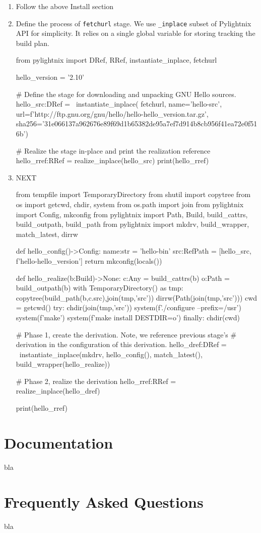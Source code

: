 \documentclass{article}
\begin{document}
\begin{enumerate}

  \item Follow the above Install section

  \item Define the process of \texttt{fetchurl} stage. We use \texttt{\_inplace}
    subset of Pylightnix API for simplicity. It relies on a single global
    variable for storing tracking the build plan.

    \begin{pythoncode}
    from pylightnix import DRef, RRef, instantiate_inplace, fetchurl

    hello_version = '2.10'

    # Define the stage for downloading and unpacking GNU Hello sources.
    hello_src:DRef = \
      instantiate_inplace(
        fetchurl,
        name='hello-src',
        url=f'http://ftp.gnu.org/gnu/hello/hello-{hello_version}.tar.gz',
        sha256='31e066137a962676e89f69d1b65382de95a7ef7d914b8cb956f41ea72e0f516b')

    # Realize the stage in-place and print the realization reference
    hello_rref:RRef = realize_inplace(hello_src)
    print(hello_rref)
    \end{pythoncode}

  \item NEXT
    \begin{pythoncode}
    from tempfile import TemporaryDirectory
    from shutil import copytree
    from os import getcwd, chdir, system
    from os.path import join
    from pylightnix import Config, mkconfig
    from pylightnix import Path, Build, build_cattrs, build_outpath, build_path
    from pylightnix import mkdrv, build_wrapper, match_latest, dirrw

    def hello_config()->Config:
      name:str = 'hello-bin'
      src:RefPath = [hello_src, f'hello-{hello_version}']
      return mkconfig(locals())

    def hello_realize(b:Build)->None:
      c:Any = build_cattrs(b)
      o:Path = build_outpath(b)
      with TemporaryDirectory() as tmp:
        copytree(build_path(b,c.src),join(tmp,'src'))
        dirrw(Path(join(tmp,'src')))
        cwd = getcwd()
        try:
          chdir(join(tmp,'src'))
          system(f'./configure --prefix=/usr')
          system(f'make')
          system(f'make install DESTDIR={o}')
        finally:
          chdir(cwd)

    # Phase 1, create the derivation. Note, we reference previous stage's
    # derivation in the configuration of this derivation.
    hello_dref:DRef = \
        instantiate_inplace(mkdrv, hello_config(), match_latest(), build_wrapper(hello_realize))

    # Phase 2, realize the derivation
    hello_rref:RRef = realize_inplace(hello_dref)

    print(hello_rref)
    \end{pythoncode}

\end{enumerate}


\section{Documentation}
bla
\section{Frequently Asked Questions}
bla
\end{document}
